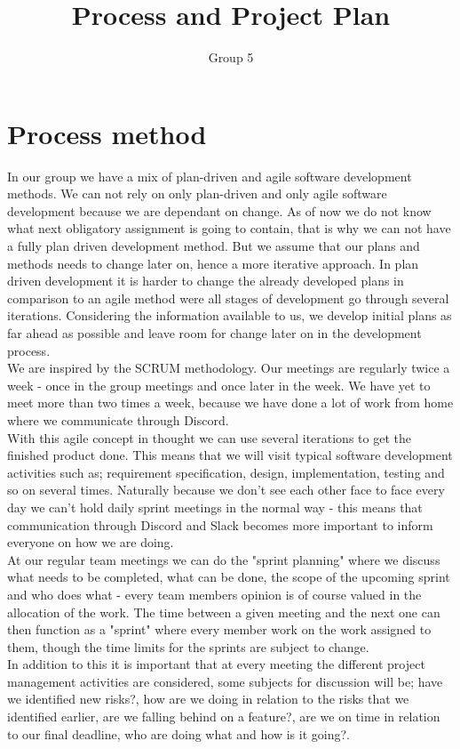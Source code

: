 \documentclass{article}
\title{Process and Project Plan}
\author{Group 5}
\date{}
\begin{document}
    \maketitle
    
    \section{Process method}
    \noindent
    In our group we have a mix of plan-driven and agile software development methods. We can not rely on only plan-driven and only agile software development because we are dependant on change. As of now we do not know what next obligatory assignment is going to contain, that is why we can not have a fully plan driven development method. But we assume that our plans and methods needs to change later on, hence a more iterative approach. In plan driven development it is harder to change the already developed plans in comparison to an agile method were all stages of development go through several iterations. Considering the information available to us, we develop initial plans as far ahead as possible and leave room for change later on in the development process. \\

    \noindent
    We are inspired by the SCRUM methodology. Our meetings are regularly twice a week - once in the group meetings and once later in the week. We have yet to meet more than two times a week, because we 
    have done a lot of work from home where we communicate through Discord. \\
    With this agile concept in thought we can use several iterations to get the finished product done. This means that we will visit typical software development activities such as; requirement specification, design, implementation, testing and so on several times. Naturally because we don't see each other face to face every day we can't hold daily sprint meetings in the normal way - this means that communication through Discord and Slack becomes more important to inform everyone on how we are doing. \\
    At our regular team meetings we can do the "sprint planning" where we discuss what needs to be completed, what can be done, the scope of the upcoming sprint and who does what - every team members opinion is of course valued in the allocation of the work. The time between a given meeting and the next one can then function as a "sprint" where every member work on the work assigned to them, though the time limits for the sprints are subject to change. \\
    In addition to this it is important that at every meeting the different project management activities are considered, some subjects for discussion will be; have we identified new risks?, how are we doing in relation to the risks that we identified earlier, are we falling behind on a feature?, are we on time in relation to our final deadline, who are doing what and how is it going?.
\end{document}
